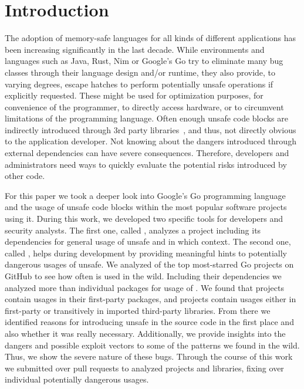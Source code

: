 \section{Introduction}
\label{sec:intro}

The adoption of memory-safe languages for all kinds of different applications has been increasing significantly in the last decade. 
While environments and languages such as Java, Rust, Nim or Google's Go try to eliminate many bug classes through their language design and/or runtime, they also provide, to varying degrees, escape hatches to perform potentially unsafe operations if explicitly requested.
These might be used for optimization purposes, for convenience of the programmer, to directly access hardware, or to circumvent limitations of the programming language.
Often enough unsafe code blocks are indirectly introduced through 3rd party libraries~\cite{evans2020}, and thus, not directly obvious to the application developer.
Not knowing about the dangers introduced through external dependencies can have severe consequences.
Therefore, developers and administrators need ways to quickly evaluate the potential risks introduced by other code.

For this paper we took a deeper look into Google's Go programming language and the usage of unsafe code blocks within the most popular software projects using it. 
During this work, we developed two specific tools for developers and security analysts.
The first one, called \toolUsage{}, analyzes a project including its dependencies for general usage of unsafe and in which context.
The second one, called \toolSA{}, helps during development by providing meaningful hints to potentially dangerous usages of unsafe.
We analyzed \projsAnalyzed{} of the top \initalProjs{} most-starred Go projects on GitHub to see how often \unsafe{} is used in the wild. 
Including their dependencies we analyzed more than \packagesAnalyzed{} individual packages for usage of \unsafe{}.
We found that \percentageProjectsWithUnsafe{} projects contain \unsafe{} usages in their first-party packages, and \percentageProjectsAndDependenciesUnsafe{}
projects contain \unsafe{} usages either in first-party or transitively in imported third-party libraries.
From there we identified reasons for introducing unsafe in the source code in the first place and also whether it was really necessary.
Additionally, we provide insights into the dangers and possible exploit vectors to some of the patterns we found in the wild. 
Thus, we show the severe nature of these bugs.
Through the course of this work we submitted over \numberPRs{} pull requests to analyzed projects and libraries, fixing over \numberBugsFixed{} individual potentially dangerous \unsafe{} usages.

